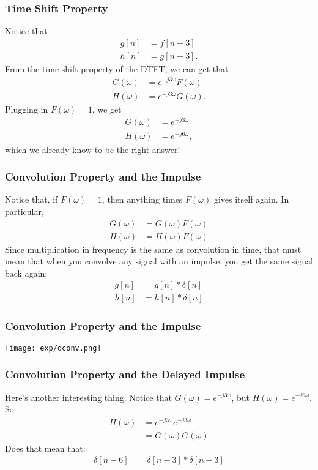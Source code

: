 \documentclass{beamer}
\begin{document}
\begin{frame}
  \frametitle{Time Shift Property}

  Notice that
  \begin{align*}
    g[n] &= f[n-3]\\
    h[n] &= g[n-3].
  \end{align*}
  From the time-shift property of the DTFT, we can get that
  \begin{align*}
    G(\omega) &= e^{-j3\omega}F(\omega)\\
    H(\omega) &= e^{-j3\omega}G(\omega).
  \end{align*}
  Plugging in $F(\omega)=1$, we get
  \begin{align*}
    G(\omega) &= e^{-j3\omega}\\
    H(\omega) &= e^{-j6\omega},
  \end{align*}
  which we already know to be the right answer!
\end{frame}

\begin{frame}
  \frametitle{Convolution Property and the Impulse}

  Notice that, if $F(\omega)=1$, then anything times $F(\omega)$ gives
  itself again.  In particular,
  \begin{align*}
    G(\omega) &= G(\omega)F(\omega)\\
    H(\omega) &= H(\omega)F(\omega)
  \end{align*}
  Since multiplication in frequency is the same as convolution in time, that must mean that
  when you convolve any signal with an impulse, you get the same signal back again:
  \begin{align*}
    g[n] &= g[n] \ast \delta[n]\\
    h[n] &= h[n]\ast \delta[n]
  \end{align*}
\end{frame}

\begin{frame}
  \frametitle{Convolution Property and the Impulse}

  \centerline{\texttt{[image: exp/dconv.png]}}
\end{frame}

\begin{frame}
  \frametitle{Convolution Property and the Delayed Impulse}

  Here's another interesting thing.  Notice that
  $G(\omega)=e^{-j3\omega}$, but $H(\omega)=e^{-j6\omega}$.  So
  \begin{align*}
    H(\omega) &= e^{-j3\omega}e^{-j3\omega}\\
    &= G(\omega)G(\omega)
  \end{align*}
  Does that mean that:
  \begin{align*}
    \delta[n-6] &= \delta[n-3]\ast \delta[n-3]
  \end{align*}
\end{frame}
\end{document}
